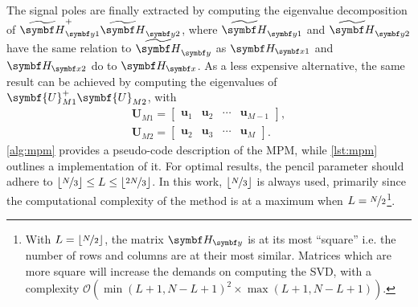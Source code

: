 The signal poles are finally extracted by computing the eigenvalue
decomposition of $\Hytildeone^+ \Hytildetwo^{\vphantom{+}}$, where
$\Hytildeone$ and $\Hytildetwo$ have the same relation to $\Hytilde$ as
$\Hxone$ and  $\Hxtwo$ do to  $\Hx$. As a less expensive alternative, the same
result can be achieved by computing the eigenvalues of
$\symbf{U}_{M1}^+\symbf{U}_{M2}^{\vphantom{+}}$, with
\begin{subequations}
    \begin{gather}
        \symbf{U}_{M1} =
        \begin{bmatrix}
            \symbf{u}_1 & \symbf{u}_2 & \cdots & \symbf{u}_{M-1}
        \end{bmatrix},\\
        \symbf{U}_{M2} =
        \begin{bmatrix}
            \symbf{u}_2 & \symbf{u}_3 & \cdots & \symbf{u}_{M}
        \end{bmatrix}.
    \end{gather}
\end{subequations}
\cref{alg:mpm} provides a pseudo-code description of the \ac{MPM}, while
\cref{lst:mpm} outlines a \Python implementation of it. For optimal
results, the pencil parameter should adhere to $\lfloor \nicefrac{N}{3} \rfloor
\leq L \leq \lfloor\nicefrac{2N}{3}\rfloor$\cite{Hua1990}. In this work,
$\lfloor\nicefrac{N}{3}\rfloor$ is always used, primarily since the computational
complexity of the method is at a maximum when $L = \nicefrac{N}{2}$\footnote{
    With $L = \lfloor\nicefrac{N}{2}\rfloor$, the matrix
    $\Hy$ is at its most ``square'' i.e. the number of rows
    and columns are at their most similar. Matrices which are more
    square will increase the demands on computing the \ac{SVD}, with a
    complexity $\mathcal{O}(\min(L+1,N-L+1)^2 \times \max(L+1,N-L+1))$.
}.

